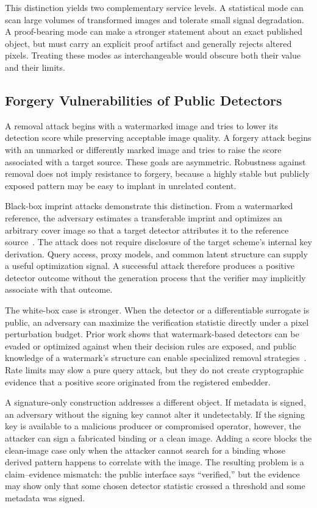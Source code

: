 This distinction yields two complementary service levels.  A statistical mode can
scan large volumes of transformed images and tolerate small signal degradation.  A
proof-bearing mode can make a stronger statement about an exact published object,
but must carry an explicit proof artifact and generally rejects altered pixels.
Treating these modes as interchangeable would obscure both their value and their
limits.

\subsection{Forgery Vulnerabilities of Public Detectors}
\label{subsec:ch4-public-detector-forgery}

A removal attack begins with a watermarked image and tries to lower its detection
score while preserving acceptable image quality.  A forgery attack begins with an
unmarked or differently marked image and tries to raise the score associated with
a target source.  These goals are asymmetric.  Robustness against removal does not
imply resistance to forgery, because a highly stable but publicly exposed pattern
may be easy to implant in unrelated content.

Black-box imprint attacks demonstrate this distinction.  From a watermarked
reference, the adversary estimates a transferable imprint and optimizes an
arbitrary cover image so that a target detector attributes it to the reference
source~\cite{muller2025blackbox}.  The attack does not require disclosure of the
target scheme's internal key derivation.  Query access, proxy models, and common
latent structure can supply a useful optimization signal.  A successful attack
therefore produces a positive detector outcome without the generation process
that the verifier may implicitly associate with that outcome.

The white-box case is stronger.  When the detector or a differentiable surrogate
is public, an adversary can maximize the verification statistic directly under a
pixel perturbation budget.  Prior work shows that watermark-based detectors can be
evaded or optimized against when their decision rules are exposed, and public
knowledge of a watermark's structure can enable specialized removal
strategies~\cite{jiang2023evading,lin2025crack}.  Rate limits may slow a pure
query attack, but they do not create cryptographic evidence that a positive score
originated from the registered embedder.

A signature-only construction addresses a different object.  If metadata is
signed, an adversary without the signing key cannot alter it undetectably.  If the
signing key is available to a malicious producer or compromised operator,
however, the attacker can sign a fabricated binding or a clean image.  Adding a
score blocks the clean-image case only when the attacker cannot search for a
binding whose derived pattern happens to correlate with the image.  The resulting
problem is a claim--evidence mismatch: the public interface says ``verified,'' but
the evidence may show only that some chosen detector statistic crossed a threshold
and some metadata was signed.

